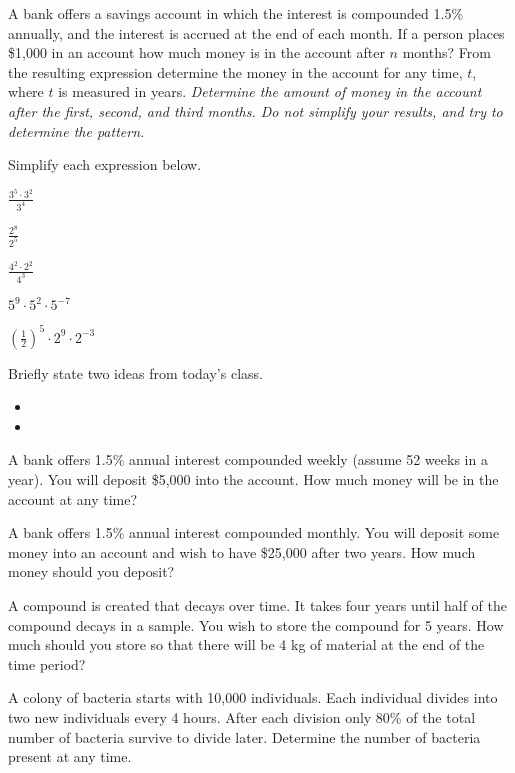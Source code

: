 \begin{problem}
  \clearpage

\item A bank offers a savings account in which the interest is
  compounded 1.5\% annually, and the interest is accrued at the end of
  each month. If a person places \$1,000 in an account how much money
  is in the account after $n$ months? From the resulting expression
  determine the money in the account for any time, $t$, where $t$ is
  measured in years.  \textit{Determine the amount of money in the
    account after the first, second, and third months. Do not simplify
    your results, and try to determine the pattern.}

  \vfill

  \clearpage

\item Simplify each expression below.
  \begin{subproblem}
  \item $\frac{3^5\cdot 3^2}{3^4}$
    \vfill
  \item $\frac{2^8}{2^5}$
    \vfill
  \item $\frac{4^2\cdot 2^2}{4^3}$
    \vfill
  \item $5^9\cdot 5^2\cdot 5^{-7}$
    \vfill
  \item $\left(\frac{1}{2}\right)^5 \cdot 2^9 \cdot 2^{-3}$
    \vfill
  \end{subproblem}

\end{problem}

\postClass

\begin{problem}
\item Briefly state two ideas from today's class.
  \begin{itemize}
  \item
  \item
  \end{itemize}
\item A bank offers 1.5\% annual interest compounded weekly (assume 52
  weeks in a year). You will deposit \$5,000 into the account. How
  much money will be in the account at any time?
\item A bank offers 1.5\% annual interest compounded monthly. You will
  deposit some money into an account and wish to have \$25,000 after
  two years. How much money should you deposit?
\item A compound is created that decays over time. It takes four years
  until half of the compound decays in a sample. You wish to store the
  compound for 5 years. How much should you store so that there will be
  4 kg of material at the end of the time period?
\item A colony of bacteria starts with 10,000 individuals. Each
  individual divides into two new individuals every 4 hours. After
  each division only 80\% of the total number of bacteria survive to
  divide later. Determine the number of bacteria present at any time.
\end{problem}


